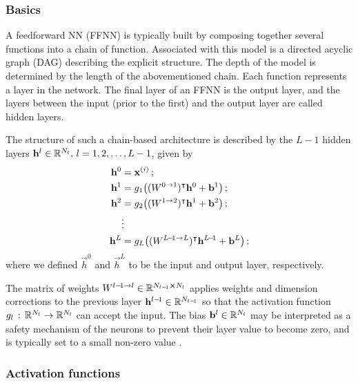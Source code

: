     \subsubsection{Basics}\label{sec:basics}

    A feedforward NN (FFNN) is typically built by composing together several functions into a chain of function. Associated with this model is a directed acyclic graph (DAG) describing the explicit structure. The depth of the model is determined by the length of the abovementioned chain. Each function represents a layer in the network. The final layer of an FFNN is the output layer, and the layers between the input (prior to the first) and the output layer are called hidden layers. \citep{Goodfellow2016}

    The structure of such a chain-based architecture is described by the $L-1$ hidden layers $\vec{h}^l \in \RR[N_l],\,l=1,2, \dots, L-1$, given by
    \begin{subequations}\label{eq:nn_layers}
        \begin{align} 
            \vec{h}^0 &= \vec{x}^{(i)}\,; \\%
            \vec{h}^1 &= g_1 \big((W^{0\to 1})\TT \vec{h}^0 + \vec{b}^1\big)\,; \\
            \vec{h}^2 &= g_2 \big( (W^{1\to 2})\TT \vec{h}^1 + \vec{b}^2\big)\,; \\
            &\vdots \nonumber \\
            \vec{h}^{L} &= g_L \big((W^{{L\!-\!1\to L}})\TT \vec{h}^{L\!-\! 1} + \vec{b}^L\big)\,;             
        \end{align}
    \end{subequations}
    where we defined $\vec{h}^0$ and $\vec{h}^L$ to be the input and output layer, respectively. 

    The matrix of weights $W^{l-\! 1\to l} \in \RR[N_{l-\!1} \cross N_l]$ applies weights and dimension corrections to the previous layer $\vec{h}^{l-\! 1}\in \RR[N_{l-\! 1}]$ so that the activation function $g_l \,:\, \RR[N_l] \to \RR[N_l]$ can accept the input. The bias $\vec{b}^l \in \RR[N_l]$ may be interpreted as a safety mechanism of the neurons to prevent their layer value to become zero, and is typically set to a small non-zero value \citep{Goodfellow2016}. 

   



    \subsubsection{Activation functions}\label{sec:activation_function}


